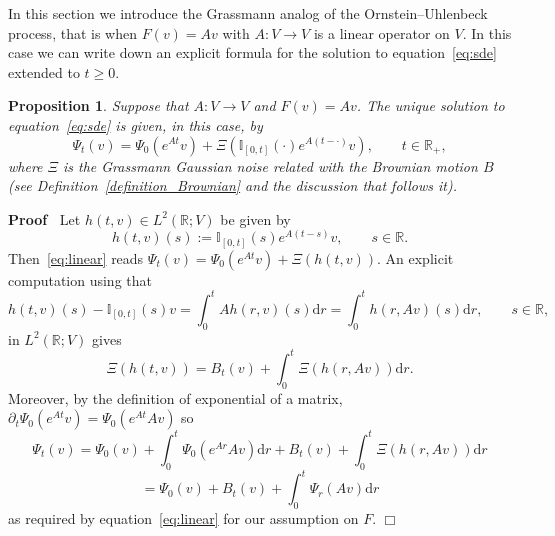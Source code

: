 \documentclass{article}
\newcommand{\assign}{:=}
\newcommand{\mathd}{\mathrm{d}}
\newenvironment{proof}{\noindent\textbf{Proof\ }}{\hspace*{\fill}$\Box$\medskip}
\newtheorem{proposition}[theorem]{Proposition}
{\theorembodyfont{\rmfamily}\newtheorem{remark}[theorem]{Remark}}
\begin{document}
In this section we introduce the Grassmann analog of the Ornstein--Uhlenbeck
process, that is when $F (v) = A v$ with $A : V \rightarrow V$ is a linear
operator on $V$. In this case we can write down an explicit formula for the
solution to equation~{\eqref{eq:sde}} extended to $t \geqslant 0$.

\begin{proposition}
  \label{proposition_linear}Suppose that $A : V \rightarrow V$ and $F (v) = A
  v$. The unique solution to equation~{\eqref{eq:sde}} is given, in this case,
  by
  \begin{equation}
    \Psi_t (v) = \Psi_0 (e^{A t} v) + \Xi (\mathbb{I}_{[0, t]} (\cdot) e^{A (t
    - \cdot)} v), \qquad t \in \mathbb{R}_+, \label{eq:linear}
  \end{equation}
  where $\Xi$ is the Grassmann Gaussian noise related with the Brownian motion
  $B$ (see Definition~\ref{definition_Brownian} and the discussion that
  follows it).
\end{proposition}

\begin{proof}
  Let $h (t, v) \in L^2 (\mathbb{R}; V)$ be given by
  \[ h (t, v) (s) \assign \mathbb{I}_{[0, t]} (s) e^{A (t - s)} v, \qquad s
     \in \mathbb{R}. \]
  Then~{\eqref{eq:linear}} reads $\Psi_t (v) = \Psi_0 (e^{A t} v) + \Xi (h (t,
  v))$. An explicit computation using that
  \[ h (t, v) (s) -\mathbb{I}_{[0, t]} (s) v = \int_0^t A h (r, v) (s) \mathd
     r = \int_0^t h (r, A v) (s) \mathd r, \qquad s \in \mathbb{R}, \]
  in $L^2 (\mathbb{R}; V)$ gives
  \[ \Xi (h (t, v)) = B_t (v) + \int_0^t \Xi (h (r, A v)) \mathd r. \]
  Moreover, by the definition of exponential of a matrix, $\partial_t \Psi_0
  (e^{A t} v) = \Psi_0 (e^{A t} A v)$ so
  \[ \Psi_t (v) = \Psi_0 (v) + \int_0^t \Psi_0 (e^{A r} A v) \mathd r + B_t
     (v) + \int_0^t \Xi (h (r, A v)) \mathd r \]
  \[ = \Psi_0 (v) + B_t (v) + \int_0^t \Psi_r (A v) \mathd r \]
  as required by equation~{\eqref{eq:linear}} for our assumption on $F$.
\end{proof}
\end{document}
